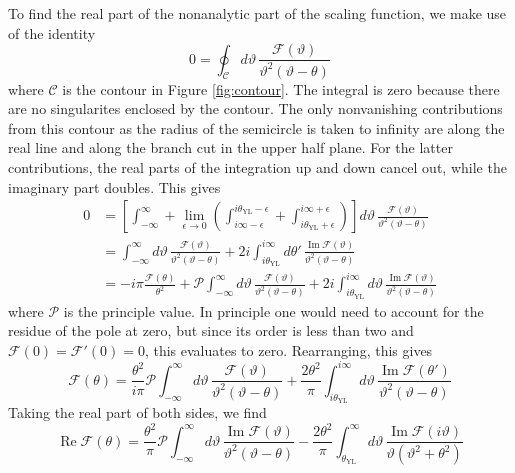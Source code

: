 \documentclass[
aps,
pre,
preprint,
longbibliography,
floatfix
]{revtex4-2}
\begin{document}
To find the real part of the nonanalytic part of the scaling function, we make
use of the identity
\begin{equation}
  0=\oint_{\mathcal C}d\vartheta\,\frac{\mathcal F(\vartheta)}{\vartheta^2(\vartheta-\theta)}
\end{equation}
where $\mathcal C$ is the contour in Figure \ref{fig:contour}. The integral is
zero because there are no singularites enclosed by the contour. The only
nonvanishing contributions from this contour as the radius of the semicircle is
taken to infinity are along the real line and along the branch cut in the upper
half plane. For the latter contributions, the real parts of the integration up
and down cancel out, while the imaginary part doubles. This gives
\begin{equation}
  \begin{aligned}
    0&=\left[\int_{-\infty}^\infty+\lim_{\epsilon\to0}\left(\int_{i\infty-\epsilon}^{i\theta_{\mathrm{YL}}-\epsilon}+\int^{i\infty+\epsilon}_{i\theta_{\mathrm{YL}}+\epsilon}\right)\right]
      d\vartheta\,\frac{\mathcal F(\vartheta)}{\vartheta^2(\vartheta-\theta)} \\
     &=\int_{-\infty}^\infty d\vartheta\,\frac{\mathcal F(\vartheta)}{\vartheta^2(\vartheta-\theta)}
     +2i\int_{i\theta_{\mathrm{YL}}}^{i\infty}d\theta'\,\frac{\operatorname{Im}\mathcal F(\vartheta)}{\vartheta^2(\vartheta-\theta)} \\
     &=-i\pi\frac{\mathcal F(\theta)}{\theta^2}+\mathcal P\int_{-\infty}^\infty d\vartheta\,\frac{\mathcal F(\vartheta)}{\vartheta^2(\vartheta-\theta)}
     +2i\int_{i\theta_{\mathrm{YL}}}^{i\infty}d\vartheta\,\frac{\operatorname{Im}\mathcal F(\vartheta)}{\vartheta^2(\vartheta-\theta)}
  \end{aligned}
\end{equation}
where $\mathcal P$ is the principle value.  In principle one would need to
account for the residue of the pole at zero, but since its order is less than
two and $\mathcal F(0)=\mathcal F'(0)=0$, this evaluates to zero. Rearranging, this gives
\begin{equation}
  \mathcal F(\theta)
  =\frac{\theta^2}{i\pi}\mathcal P\int_{-\infty}^\infty d\vartheta\,\frac{\mathcal F(\vartheta)}{\vartheta^2(\vartheta-\theta)}
  +\frac{2\theta^2}\pi\int_{i\theta_{\mathrm{YL}}}^{i\infty}d\vartheta\,\frac{\operatorname{Im}\mathcal F(\theta')}{\vartheta^2(\vartheta-\theta)}
\end{equation}
Taking the real part of both sides, we find
\begin{equation}
  \operatorname{Re}\mathcal F(\theta)
  =\frac{\theta^2}{\pi}\mathcal P\int_{-\infty}^\infty d\vartheta\,\frac{\operatorname{Im}\mathcal F(\vartheta)}{\vartheta^2(\vartheta-\theta)}
  -\frac{2\theta^2}\pi\int_{\theta_{\mathrm{YL}}}^{\infty}d\vartheta\,\frac{\operatorname{Im}\mathcal F(i\vartheta)}{\vartheta(\vartheta^2+\theta^2)}
\end{equation}
\end{document}
